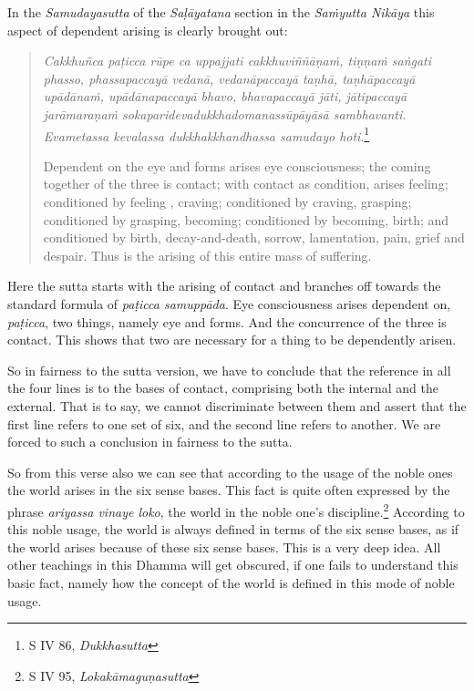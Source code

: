In the \emph{Samudayasutta} of the \emph{Saḷāyatana} section in the \emph{Saṁyutta Nikāya} this aspect of dependent arising is clearly brought out:

\begin{quote}
\emph{Cakkhuñca paṭicca rūpe ca uppajjati cakkhuviññāṇaṁ, tiṇṇaṁ saṅgati phasso, phassapaccayā vedanā, vedanāpaccayā taṇhā, taṇhāpaccayā upādānaṁ, upādānapaccayā bhavo, bhavapaccayā jāti, jātipaccayā jarāmaraṇaṁ sokaparidevadukkhadomanassūpāyāsā sambhavanti. Evametassa kevalassa dukkhakkhandhassa samudayo hoti}.\footnote{S IV 86, \emph{Dukkhasutta}}

Dependent on the eye and forms arises eye consciousness; the coming together of the three is contact; with contact as condition, arises feeling; conditioned by feeling , craving; conditioned by craving, grasping; conditioned by grasping, becoming; conditioned by becoming, birth; and conditioned by birth, decay-and-death, sorrow, lamentation, pain, grief and despair. Thus is the arising of this entire mass of suffering.
\end{quote}

Here the sutta starts with the arising of contact and branches off towards the standard formula of \emph{paṭicca samuppāda}. Eye consciousness arises dependent on, \emph{paṭicca}, two things, namely eye and forms. And the concurrence of the three is contact. This shows that two are necessary for a thing to be dependently arisen.

So in fairness to the sutta version, we have to conclude that the reference in all the four lines is to the bases of contact, comprising both the internal and the external. That is to say, we cannot discriminate between them and assert that the first line refers to one set of six, and the second line refers to another. We are forced to such a conclusion in fairness to the sutta.

So from this verse also we can see that according to the usage of the noble ones the world arises in the six sense bases. This fact is quite often expressed by the phrase \emph{ariyassa vinaye loko}, the world in the noble one's discipline.\footnote{S IV 95, \emph{Lokakāmaguṇasutta}} According to this noble usage, the world is always defined in terms of the six sense bases, as if the world arises because of these six sense bases. This is a very deep idea. All other teachings in this Dhamma will get obscured, if one fails to understand this basic fact, namely how the concept of the world is defined in this mode of noble usage.

